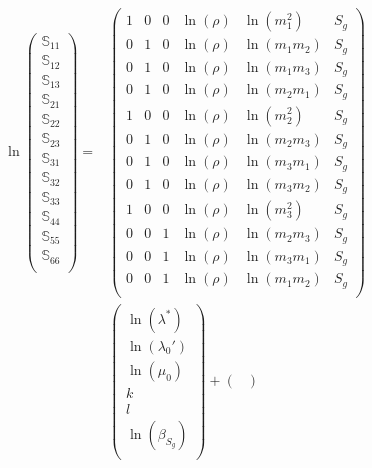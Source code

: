 \documentclass[a4paper,fleqn]{DC_ArtStyle}
\begin{document}
\begin{equation}
	\begin{split}
		\ln
		\begin{pmatrix}
			\mathbb{S}_{11} \\
			\mathbb{S}_{12} \\
			\mathbb{S}_{13} \\
			\mathbb{S}_{21} \\
			\mathbb{S}_{22} \\
			\mathbb{S}_{23} \\
			\mathbb{S}_{31} \\
			\mathbb{S}_{32} \\
			\mathbb{S}_{33} \\
			\mathbb{S}_{44} \\
			\mathbb{S}_{55} \\
			\mathbb{S}_{66} \\
		\end{pmatrix} = &\begin{pmatrix}
			1 & 0 & 0 & \ln(\rho) & \ln(m_1^2) & S_g \\
			0 & 1 & 0 & \ln(\rho) & \ln(m_1 m_2) & S_g \\
			0 & 1 & 0 & \ln(\rho) & \ln(m_1 m_3) & S_g \\
			0 & 1 & 0 & \ln(\rho) & \ln(m_2 m_1) & S_g \\
			1 & 0 & 0 & \ln(\rho) & \ln(m_2^2) & S_g \\
			0 & 1 & 0 & \ln(\rho) & \ln(m_2 m_3) & S_g \\
			0 & 1 & 0 & \ln(\rho) & \ln(m_3 m_1) & S_g \\
			0 & 1 & 0 & \ln(\rho) & \ln(m_3 m_2) & S_g \\
			1 & 0 & 0 & \ln(\rho) & \ln(m_3^2) & S_g \\
			0 & 0 & 1 & \ln(\rho) & \ln(m_2 m_3) & S_g \\
			0 & 0 & 1 & \ln(\rho) & \ln(m_3 m_1) & S_g \\
			0 & 0 & 1 & \ln(\rho) & \ln(m_1 m_2) & S_g \\
		\end{pmatrix} \\ & \begin{pmatrix}
			\ln(\lambda^{*}) \\
			\ln(\lambda_0') \\
			\ln(\mu_0) \\
			k \\
			l \\
			\ln(\beta_{S_g})\\
		\end{pmatrix} + \begin{pmatrix}

\end{pmatrix}
\end{split}
\end{equation}
\end{document}
